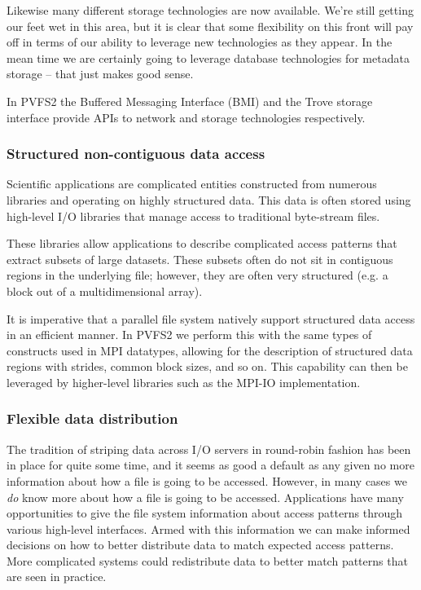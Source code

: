 Likewise many different storage technologies are now available.  We're still
getting our feet wet in this area, but it is clear that some flexibility on
this front will pay off in terms of our ability to leverage new technologies
as they appear.  In the mean time we are certainly going to leverage database
technologies for metadata storage -- that just makes good sense.

In PVFS2 the Buffered Messaging Interface (BMI) and the Trove storage
interface provide APIs to network and storage technologies respectively.

\subsubsection{Structured non-contiguous data access}

Scientific applications are complicated entities constructed from numerous
libraries and operating on highly structured data.  This data is often stored
using high-level I/O libraries that manage access to traditional byte-stream
files.

These libraries allow applications to describe complicated access patterns
that extract subsets of large datasets.  These subsets often do not sit in
contiguous regions in the underlying file; however, they are often very
structured (e.g. a block out of a multidimensional array).

It is imperative that a parallel file system natively support structured data
access in an efficient manner.  In PVFS2 we perform this with the same types
of constructs used in MPI datatypes, allowing for the description of
structured data regions with strides, common block sizes, and so on.  This
capability can then be leveraged by higher-level libraries such as the MPI-IO
implementation.

\subsubsection{Flexible data distribution}

The tradition of striping data across I/O servers in round-robin fashion has
been in place for quite some time, and it seems as good a default as any given
no more information about how a file is going to be accessed.  However, in
many cases we \emph{do} know more about how a file is going to be accessed.
%
Applications have many opportunities to give the file system information about
access patterns through various high-level interfaces.  Armed with this
information we can make informed decisions on how to better distribute data to
match expected access patterns.  More complicated systems could redistribute
data to better match patterns that are seen in practice.

